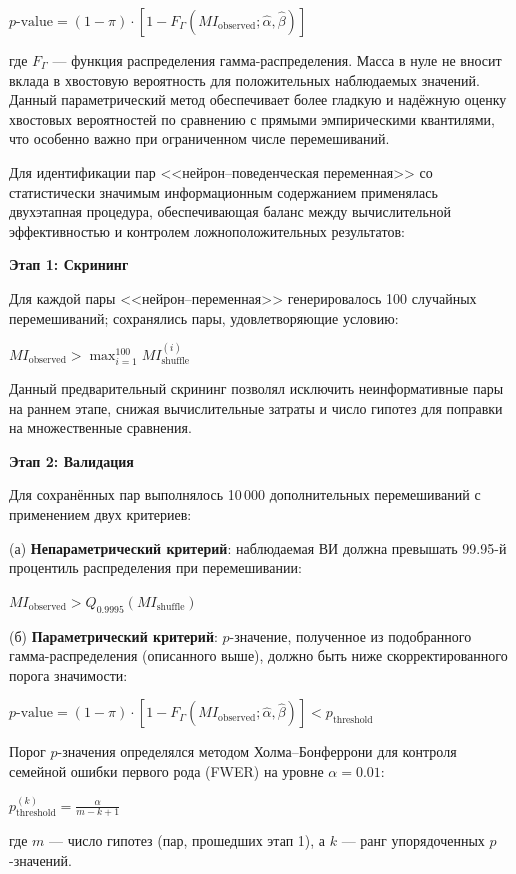 $p\text{-value} = (1 - \pi) \cdot [1 - F_\Gamma(MI_{\text{observed}}; \hat{\alpha}, \hat{\beta})]$

где $F_\Gamma$ --- функция распределения гамма-распределения. Масса в нуле не вносит вклада в хвостовую вероятность для положительных наблюдаемых значений. Данный параметрический метод обеспечивает более гладкую и надёжную оценку хвостовых вероятностей по сравнению с прямыми эмпирическими квантилями, что особенно важно при ограниченном числе перемешиваний.

Для идентификации пар <<нейрон--поведенческая переменная>> со статистически значимым информационным содержанием применялась двухэтапная процедура, обеспечивающая баланс между вычислительной эффективностью
и контролем ложноположительных результатов:

\textbf{Этап 1: Скрининг}

Для каждой пары <<нейрон--переменная>> генерировалось 100 случайных перемешиваний; сохранялись пары, удовлетворяющие условию:

$MI_{\text{observed}} > \max_{i=1}^{100} MI_{\text{shuffle}}^{(i)}$

Данный предварительный скрининг позволял исключить неинформативные пары на раннем этапе, снижая вычислительные затраты и число гипотез для поправки на множественные сравнения.

\textbf{Этап 2: Валидация}

Для сохранённых пар выполнялось 10\,000 дополнительных перемешиваний с применением двух критериев:

(а) \textbf{Непараметрический критерий}: наблюдаемая ВИ должна превышать 99.95-й процентиль распределения при перемешивании:

$MI_{\text{observed}} > Q_{0.9995}(MI_{\text{shuffle}})$

(б) \textbf{Параметрический критерий}: $p$-значение, полученное из подобранного гамма-распределения (описанного выше), должно быть ниже скорректированного порога значимости:

$p\text{-value} = (1 - \pi) \cdot [1 - F_\Gamma(MI_{\text{observed}}; \hat{\alpha}, \hat{\beta})]
< p_{\text{threshold}}$

Порог $p$-значения определялся методом Холма--Бонферрони для контроля семейной ошибки первого рода (FWER) на уровне $\alpha = 0.01$:

$p_{\text{threshold}}^{(k)} = \frac{\alpha}{m - k + 1}$

где $m$ --- число гипотез (пар, прошедших этап 1), а $k$ --- ранг упорядоченных $p$-значений.


